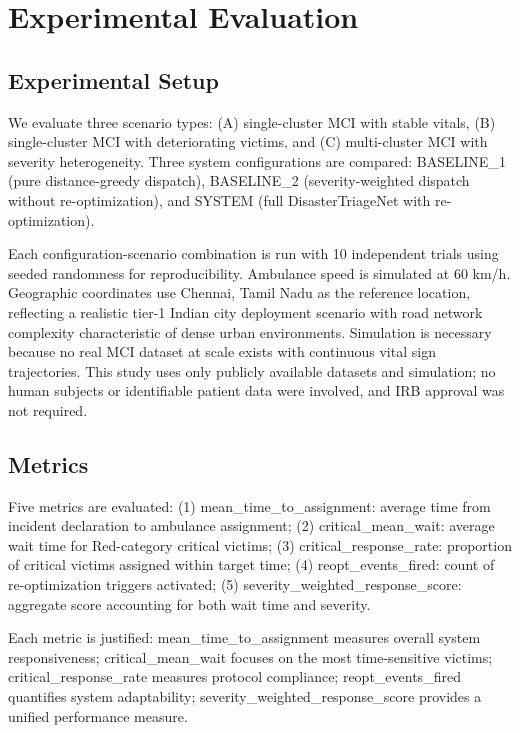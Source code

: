 \documentclass[conference]{IEEEtran}
\begin{document}
\section{Experimental Evaluation}

\subsection{Experimental Setup}

We evaluate three scenario types: (A) single-cluster MCI with stable vitals, (B) single-cluster MCI with deteriorating victims, and (C) multi-cluster MCI with severity heterogeneity. Three system configurations are compared: BASELINE\_1 (pure distance-greedy dispatch), BASELINE\_2 (severity-weighted dispatch without re-optimization), and SYSTEM (full DisasterTriageNet with re-optimization).

Each configuration-scenario combination is run with 10 independent trials using seeded randomness for reproducibility. Ambulance speed is simulated at 60 km/h. Geographic coordinates use Chennai, Tamil Nadu as the reference location, reflecting a realistic tier-1 Indian city deployment scenario with road network complexity characteristic of dense urban environments. Simulation is necessary because no real MCI dataset at scale exists with continuous vital sign trajectories. This study uses only publicly available datasets and simulation; no human subjects or identifiable patient data were involved, and IRB approval was not required.

\subsection{Metrics}

Five metrics are evaluated: (1) mean\_time\_to\_assignment: average time from incident declaration to ambulance assignment; (2) critical\_mean\_wait: average wait time for Red-category critical victims; (3) critical\_response\_rate: proportion of critical victims assigned within target time; (4) reopt\_events\_fired: count of re-optimization triggers activated; (5) severity\_weighted\_response\_score: aggregate score accounting for both wait time and severity.

Each metric is justified: mean\_time\_to\_assignment measures overall system responsiveness; critical\_mean\_wait focuses on the most time-sensitive victims; critical\_response\_rate measures protocol compliance; reopt\_events\_fired quantifies system adaptability; severity\_weighted\_response\_score provides a unified performance measure.
\end{document}
